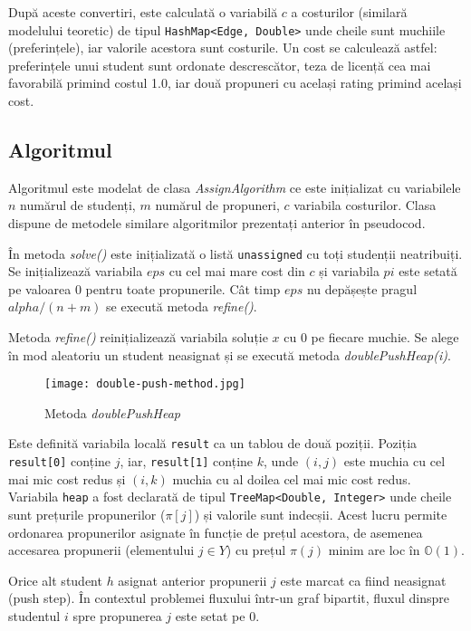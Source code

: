 După aceste convertiri, este calculată o variabilă $c$ a costurilor (similară modelului teoretic) de tipul \texttt{HashMap<Edge, Double>} unde cheile sunt muchiile (preferințele), iar valorile acestora sunt costurile. Un cost se calculează astfel: preferințele unui student sunt ordonate descrescător, teza de licență cea mai favorabilă primind costul 1.0, iar două propuneri cu același rating primind același cost.

\subsection{Algoritmul}

Algoritmul este modelat de clasa \textit{AssignAlgorithm} ce este inițializat cu variabilele $n$ numărul de studenți, $m$ numărul de propuneri, $c$ variabila costurilor. Clasa dispune de metodele similare algoritmilor prezentați anterior în pseudocod.

În metoda \textit{solve()} este inițializată o listă \texttt{unassigned} cu toți studenții neatribuiți. Se inițializează variabila $eps$ cu cel mai mare cost din $c$ și variabila $pi$ este setată pe valoarea 0 pentru toate propunerile. Cât timp $eps$ nu depășește pragul $alpha / (n + m)$ se execută metoda \textit{refine()}.

Metoda \textit{refine()} reinițializează variabila soluție $x$ cu 0 pe fiecare muchie. Se alege în mod aleatoriu un student neasignat și se execută metoda \textit{doublePushHeap(i)}.

\begin{figure}[H]
	\centering
	\texttt{[image: double-push-method.jpg]}
	\caption{Metoda \textit{doublePushHeap}}
\end{figure}

Este definită variabila locală \texttt{result} ca un tablou de două poziții. Poziția \texttt{result[0]} conține $j$, iar, \texttt{result[1]} conține $k$, unde $(i, j)$ este muchia cu cel mai mic cost redus și $(i, k)$ muchia cu al doilea cel mai mic cost redus. Variabila \texttt{heap} a fost declarată de tipul \texttt{TreeMap<Double, Integer>} unde cheile sunt prețurile propunerilor (\texttt{$\pi[j]$}) și valorile sunt indecșii. Acest lucru permite ordonarea propunerilor asignate în funcție de prețul acestora, de asemenea accesarea propunerii (elementului $j \in Y$) cu prețul $\pi(j)$ minim are loc în $\mathbb{O}(1)$.

Orice alt student $h$ asignat anterior propunerii $j$ este marcat ca fiind neasignat (push step). În contextul problemei fluxului într-un graf bipartit, fluxul dinspre studentul $i$ spre propunerea $j$ este setat pe 0.

